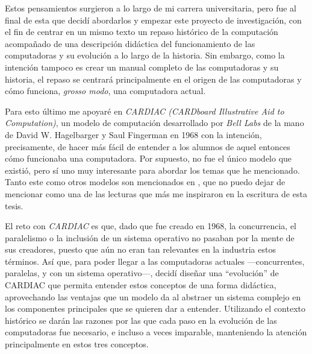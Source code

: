 \documentclass[letterpaper,12pt,oneside]{book}
\begin{document}
	Estos pensamientos surgieron a lo largo de mi carrera universitaria, pero fue al final de esta que decidí abordarlos y empezar este proyecto de investigación,
	con el fin de centrar en un mismo texto un repaso histórico de la computación acompañado de una descripción didáctica del funcionamiento de las computadoras
	y su evolución a lo largo de la historia. Sin embargo, como la intención tampoco es crear un manual completo de las computadoras y su historia, el repaso
	se centrará principalmente en el origen de las computadoras y cómo funciona, \textit{grosso modo}, una computadora actual.
 
    Para esto último me apoyaré
	en \textit{CARDIAC (CARDboard Illustrative Aid to Computation)}, un modelo de computación 
	desarrollado por \textit{Bell Labs} de la mano de David W. Hagelbarger y Saul Fingerman en 1968\cite{fingerman_instruction_1968} con la intención, precisamente,
	de hacer más fácil de entender a los alumnos de aquel entonces cómo funcionaba una computadora. 
    Por supuesto, no fue el único modelo que existió, pero sí uno muy interesante para abordar
    los temas que he mencionado. Tanto este como otros
    modelos son mencionados en \cite{mark_jones_lorenzo_paper_2017}, que
	no puedo dejar de mencionar como una de las lecturas que más me inspiraron en la escritura de esta tesis.
	
	El reto con \textit{CARDIAC} es que, dado que fue creado en 1968, la concurrencia, el paralelismo o
	la inclusión de un sistema operativo no pasaban por la mente de sus creadores, puesto que aún no eran tan relevantes en la industria estos términos. Así que,
	para poder llegar a las computadoras actuales —concurrentes, paralelas, y con un sistema operativo—, decidí diseñar una ``evolución'' de CARDIAC que permita
	entender estos conceptos de una forma didáctica, aprovechando las ventajas que un modelo da al abstraer un sistema complejo en los componentes principales
	que se quieren dar a entender. Utilizando el contexto histórico se darán las razones por las que cada paso en la evolución de las
	computadoras fue necesario, e incluso a veces imparable, manteniendo la atención principalmente en estos tres conceptos.
	 
\end{document}
